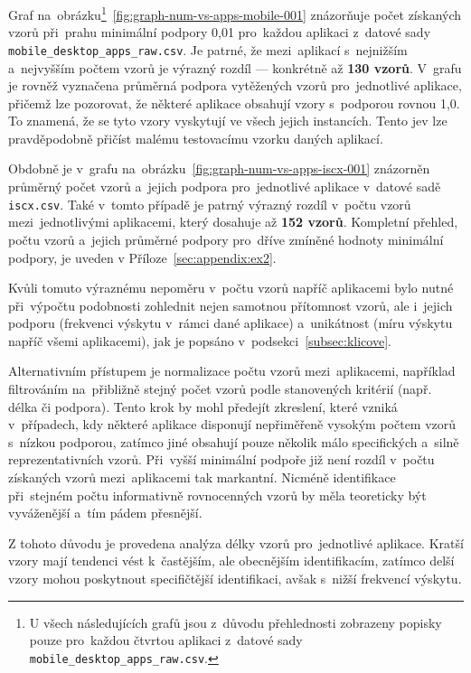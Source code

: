 Graf na~obrázku\footnote{U všech následujících grafů jsou z~důvodu přehlednosti zobrazeny popisky pouze pro~každou čtvrtou aplikaci z~datové sady \texttt{mobile\_desktop\_apps\_raw.csv}.}~\ref{fig:graph-num-vs-apps-mobile-001} znázorňuje počet získaných vzorů při~prahu minimální podpory 0{,}01 pro~každou aplikaci z~datové sady \texttt{mobile\_desktop\_apps\_raw.csv}. Je patrné, že mezi~aplikací s~nejnižším a~nejvyšším počtem vzorů je výrazný rozdíl — konkrétně až \textbf{130 vzorů}. V~grafu je rovněž vyznačena průměrná podpora vytěžených vzorů pro~jednotlivé aplikace, přičemž lze pozorovat, že některé aplikace obsahují vzory s~podporou rovnou 1{,}0. To znamená, že se tyto vzory vyskytují ve všech jejich instancích. Tento jev lze pravděpodobně přičíst malému testovacímu vzorku daných aplikací.

Obdobně je v~grafu na~obrázku~\ref{fig:graph-num-vs-apps-iscx-001} znázorněn průměrný počet vzorů a~jejich podpora pro~jednotlivé aplikace v~datové sadě \texttt{iscx.csv}. Také v~tomto případě je patrný výrazný rozdíl v~počtu vzorů mezi~jednotlivými aplikacemi, který dosahuje až \textbf{152 vzorů}. Kompletní přehled, počtu vzorů a~jejich průměrné podpory pro~dříve zmíněné hodnoty minimální podpory, je uveden v Příloze~\ref{sec:appendix:ex2}.

Kvůli tomuto výraznému nepoměru v~počtu vzorů napříč aplikacemi bylo nutné při~výpočtu podobnosti zohlednit nejen samotnou přítomnost vzorů, ale i~jejich podporu (frekvenci výskytu v~rámci dané aplikace) a~unikátnost (míru výskytu napříč všemi aplikacemi), jak je popsáno v~podsekci~\ref{subsec:klicove}. 

Alternativním přístupem je normalizace počtu vzorů mezi~aplikacemi, například filtrováním na~přibližně stejný počet vzorů podle stanovených kritérií (např. délka či podpora). Tento krok by mohl předejít zkreslení, které vzniká v~případech, kdy některé aplikace disponují nepřiměřeně vysokým počtem vzorů s~nízkou podporou, zatímco jiné obsahují pouze několik málo specifických a~silně reprezentativních vzorů. Při~vyšší minimální podpoře již není rozdíl v~počtu získaných vzorů mezi~aplikacemi tak markantní. Nicméně identifikace při~stejném počtu informativně rovnocenných vzorů by měla teoreticky být vyváženější a~tím pádem přesnější.

Z tohoto důvodu je provedena analýza délky vzorů pro~jednotlivé aplikace. Kratší vzory mají tendenci vést k~častějším, ale obecnějším identifikacím, zatímco delší vzory mohou poskytnout specifičtější identifikaci, avšak s~nižší frekvencí výskytu.

